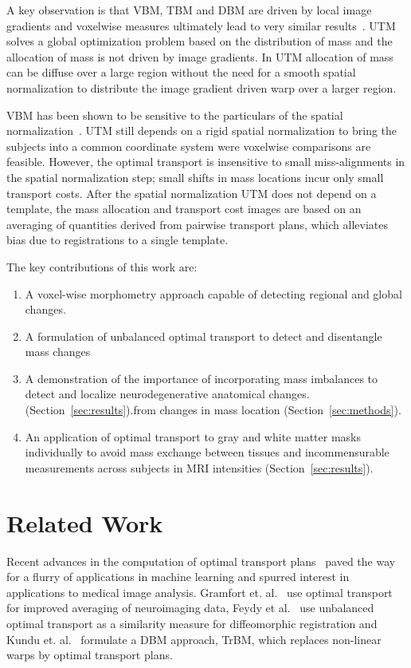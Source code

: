 \documentclass{llncs}
\begin{document}
A key observation is that VBM, TBM and DBM are driven by local image gradients
and voxelwise measures ultimately lead to very similar
results~\cite[Chaper~6]{frackowiak2004human}.  UTM solves a global optimization
problem based on the distribution of mass and the allocation of mass is not
driven by image gradients. In UTM allocation of mass can be diffuse over a
large region without the need for a smooth spatial normalization to distribute
the image gradient driven warp over a larger region. 

VBM has been shown to be sensitive to the particulars of the spatial
normalization~\cite{bookstein2001voxel,davatzikos2004voxel}. UTM still depends
on a rigid spatial normalization to bring the subjects into a common coordinate
system were voxelwise comparisons are feasible. However, the optimal transport
is insensitive to small miss-alignments in the spatial normalization step;
small shifts in mass locations incur only small transport costs.  After the
spatial normalization UTM does not depend on a template, the mass allocation
and transport cost images are based on an averaging of quantities derived from
pairwise transport plans, which alleviates bias due to registrations to a
single template. 

The key contributions of this work are:
\vspace{-1mm}
\begin{enumerate}
\item A voxel-wise morphometry approach capable of detecting regional and
  global changes.  
\item A formulation of unbalanced optimal transport to detect and disentangle mass
  changes 
\item A demonstration of the importance of incorporating mass imbalances to
  detect and localize neurodegenerative anatomical changes.
  (Section~\ref{sec:results}).from changes in mass location (Section~\ref{sec:methods}).
\item An application of optimal transport to gray and white matter masks
  individually to avoid mass exchange between tissues and incommensurable
  measurements across subjects in MRI intensities (Section~\ref{sec:results}).  
\end{enumerate}


\section{Related Work}
Recent advances in the computation of optimal transport
plans~\cite{cuturi2013sinkhorn,gerber2017multiscale} paved the way for a flurry
of applications in machine learning and spurred interest in applications to
medical image analysis. Gramfort et.  al.~\cite{gramfort2015fast} use optimal
transport for improved averaging of neuroimaging data, Feydy et
al.~\cite{feydy2017optimal} use unbalanced optimal transport as a similarity
measure for diffeomorphic registration and Kundu et.
al.~\cite{kundu2018discovery} formulate a DBM approach, TrBM, which replaces
non-linear warps by optimal transport plans. 
\end{document}
